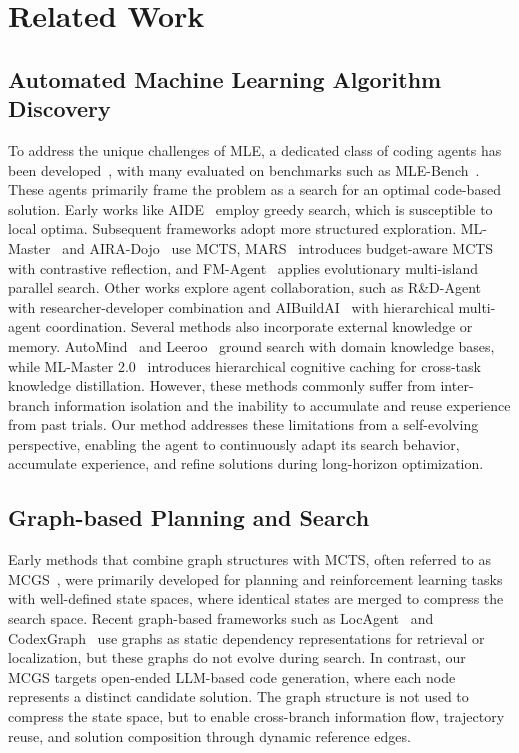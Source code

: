
\section{Related Work}
\label{related_works}

\subsection{Automated Machine Learning Algorithm Discovery}
To address the unique challenges of MLE, a dedicated class of coding agents has been developed~\citep{aide,mle-star,mlzero,ml-master}, with many evaluated on benchmarks such as MLE-Bench~\citep{mle-bench}. These agents primarily frame the problem as a search for an optimal code-based solution. Early works like AIDE~\citep{aide} employ greedy search, which is susceptible to local optima. Subsequent frameworks adopt more structured exploration. ML-Master~\citep{ml-master} and AIRA-Dojo~\citep{dojo} use MCTS, MARS~\citep{chen2026mars} introduces budget-aware MCTS with contrastive reflection, and FM-Agent~\citep{li2025fm} applies evolutionary multi-island parallel search. Other works explore agent collaboration, such as R\&D-Agent~\citep{rdagent} with researcher-developer combination and AIBuildAI~\citep{zhang2026aibuildai} with hierarchical multi-agent coordination. Several methods also incorporate external knowledge or memory. AutoMind~\citep{automind} and Leeroo~\citep{nadafian2026kapso} ground search with domain knowledge bases, while ML-Master 2.0~\citep{zhu2026mlmaster2} introduces hierarchical cognitive caching for cross-task knowledge distillation. However, these methods commonly suffer from inter-branch information isolation and the inability to accumulate and reuse experience from past trials. Our method addresses these limitations from a self-evolving perspective, enabling the agent to continuously adapt its search behavior, accumulate experience, and refine solutions during long-horizon optimization.


\subsection{Graph-based Planning and Search}
Early methods that combine graph structures with MCTS, often referred to as MCGS~\citep{mcgs1,mcgs2}, were primarily developed for planning and reinforcement learning tasks with well-defined state spaces, where identical states are merged to compress the search space. Recent graph-based frameworks such as LocAgent~\citep{locagent2025} and CodexGraph~\citep{codexgraph2025} use graphs as static dependency representations for retrieval or localization, but these graphs do not evolve during search. In contrast, our MCGS targets open-ended LLM-based code generation, where each node represents a distinct candidate solution. The graph structure is not used to compress the state space, but to enable cross-branch information flow, trajectory reuse, and solution composition through dynamic reference edges.

